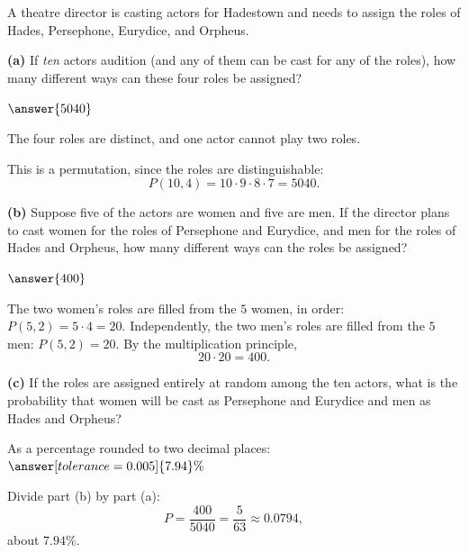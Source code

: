 \documentclass[12pt]{ximera}
\begin{document}
\begin{problem}
A theatre director is casting actors for Hadestown and needs to assign the roles of
Hades, Persephone, Eurydice, and Orpheus.

\begin{prompt}
\textbf{(a)} If \emph{ten} actors audition (and any of them can be cast for any of
the roles), how many different ways can these four roles be assigned?

$\answer{5040}$

\begin{hint}
The four roles are distinct, and one actor cannot play two roles.
\end{hint}

\begin{solution}
This is a permutation, since the roles are distinguishable:
\[ P(10,4)=10\cdot 9\cdot 8\cdot 7 = 5040. \]
\end{solution}
\end{prompt}

\begin{prompt}
\textbf{(b)} Suppose five of the actors are women and five are men. If the director
plans to cast women for the roles of Persephone and Eurydice, and men for the roles
of Hades and Orpheus, how many different ways can the roles be assigned?

$\answer{400}$

\begin{solution}
The two women's roles are filled from the $5$ women, in order:
$P(5,2)=5\cdot 4=20$. Independently, the two men's roles are filled from the $5$ men:
$P(5,2)=20$. By the multiplication principle,
\[ 20 \cdot 20 = 400. \]
\end{solution}
\end{prompt}

\begin{prompt}
\textbf{(c)} If the roles are assigned entirely at random among the ten actors, what
is the probability that women will be cast as Persephone and Eurydice and men as
Hades and Orpheus?

As a percentage rounded to two decimal places: $\answer[tolerance=0.005]{7.94}\%$

\begin{solution}
Divide part (b) by part (a):
\[
P = \frac{400}{5040} = \frac{5}{63} \approx 0.0794,
\]
about $7.94\%$.
\end{solution}
\end{prompt}
\end{problem}
\end{document}
